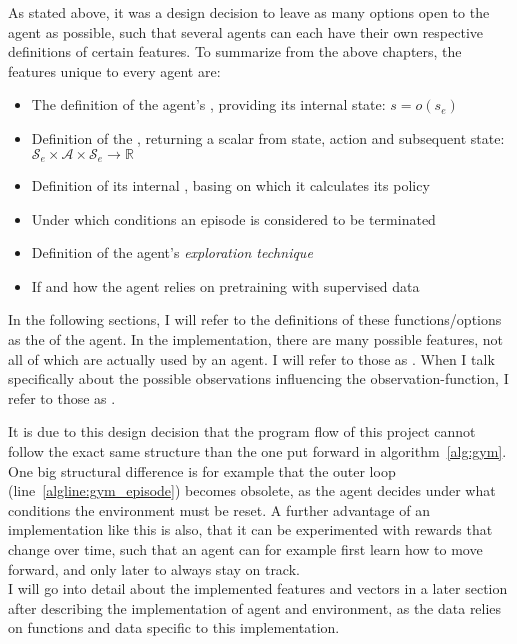 As stated above, it was a design decision to leave as many options open to the agent as possible, such that several agents can each have their own respective definitions of certain features. To summarize from the above chapters, the features unique to every agent are:
\begin{itemize}
	\item The definition of the agent's , providing its internal state: $s = o(s_e)$
	\item Definition of the , returning a scalar from state, action and subsequent state: $\mathcal{S}_e \times \mathcal{A} \times \mathcal{S}_e \rightarrow \mathds{R}$
	\item Definition of its internal , basing on which it calculates its policy
	\item Under which conditions an episode is considered to be terminated 
	\item Definition of the agent's \textit{exploration technique}
	\item If and how the agent relies on pretraining with supervised data	
\end{itemize}
\begin{flushright}
	\scriptsize
	In the following sections, I will refer to the definitions of these functions/options as the  of the agent. In the implementation, there are many possible features, not all of which are actually used by an agent. I will refer to those as . When I talk specifically about the possible observations influencing the observation-function, I refer to those as .
\end{flushright}

It is due to this design decision that the program flow of this project cannot follow the exact same structure than the one put forward in algorithm~\ref{alg:gym}. One big structural difference is for example that the outer loop (line~\ref{algline:gym_episode}) becomes obsolete, as the agent decides under what conditions the environment must be reset. A further advantage of an implementation like this is also, that it can be experimented with rewards that change over time, such that an agent can for example first learn how to move forward, and only later to always stay on track.\\

\noindent I will go into detail about the implemented features and vectors in a later section after describing the implementation of agent and environment, as the data relies on functions and data specific to this implementation.


